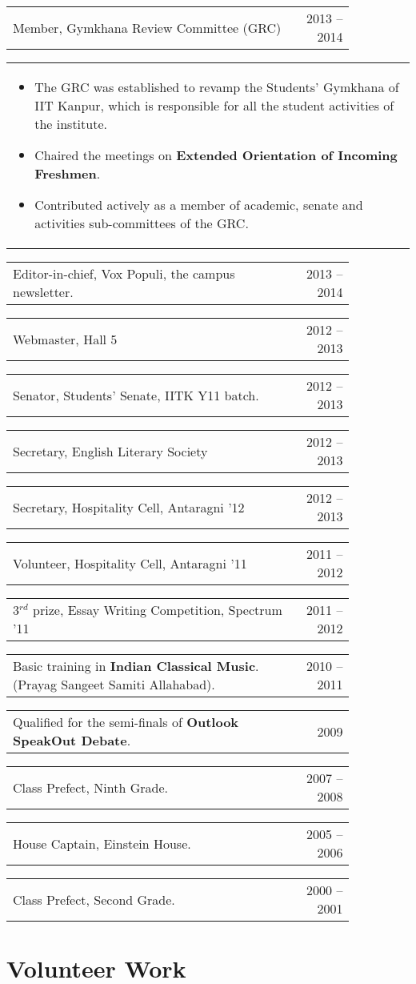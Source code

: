 \documentclass[a4paper,10pt]{article} %
\newcommand{\iproject}[3]{
    \begin{tabular}{p{0.85\linewidth}r}
        \textcolor{NavyBlue}{#2} & \multicolumn{1}{m{3cm}}{\raggedleft \textsc{#1}}\\
    \end{tabular}
    \begin{tabular}{p{\linewidth}}
    \vspace{-0.3cm}
        \footnotesize{#3}
    \end{tabular}
    \vspace{-0.5cm}
}
\newcommand{\skill}[2]{
    \begin{tabular}{p{0.85\linewidth}r}
        #2 & \multicolumn{1}{m{3cm}}{\raggedleft \textsc{#1}}\\
    \end{tabular}
    \vspace{-0.5cm}
}
\begin{document}
\iproject {2013 -- 2014}
          {Member, Gymkhana Review Committee (GRC)}
          {
               \begin{itemize}[leftmargin=0.5cm]
                   \item The GRC was established to revamp the Students' Gymkhana of IIT Kanpur,
                       which is responsible for all the student activities of the institute.
                   \item Chaired the meetings on \textbf{Extended Orientation of Incoming Freshmen}.
                   \item Contributed actively as a member of academic, senate and activities sub-committees of the GRC.
               \end{itemize}
          }

\skill {2013 -- 2014}
       {Editor-in-chief, Vox Populi, the campus newsletter.}

\skill {2012 -- 2013}
       {Webmaster, Hall 5}

\skill {2012 -- 2013}
       {Senator, Students' Senate, IITK Y11 batch.}

\skill {2012 -- 2013}
       {Secretary, English Literary Society}

\skill {2012 -- 2013}
       {Secretary, Hospitality Cell, Antaragni '12}

\skill {2011 -- 2012}
       {Volunteer, Hospitality Cell, Antaragni '11}

\skill {2011 -- 2012}
       {3$^{rd}$ prize, Essay Writing Competition, Spectrum '11}

\skill {2010 -- 2011}
       {Basic training in \textbf{Indian Classical Music}. (Prayag Sangeet Samiti Allahabad).}

\skill {2009}
       {Qualified for the semi-finals of \textbf{Outlook SpeakOut Debate}.}

\skill {2007 -- 2008}
       {Class Prefect, Ninth Grade.}

\skill {2005 -- 2006}
       {House Captain, Einstein House.}

\skill {2000 -- 2001}
       {Class Prefect, Second Grade.}


\section{Volunteer Work}
\end{document}
